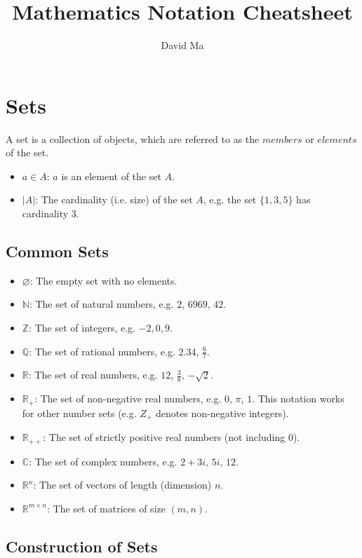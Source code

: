 \documentclass[12pt]{article}
\title{\vspace{-2.0cm}Mathematics Notation Cheatsheet}
\author{David Ma}
\theoremstyle{definition}
\newcommand{\RR}{\mathbb{R}}
\newcommand{\NN}{\mathbb{N}}
\newcommand{\CC}{\mathbb{C}}
\newcommand{\bras}[1]{\lbrace #1 \rbrace}
\begin{document}
	\maketitle
	
	\section{Sets}
	
	A set is a collection of objects, which are referred to as the $members$ or $elements$ of the set.
	
	\begin{itemize}
		\item $a \in A$: $a$ is an element of the set $A$.
		\item $|A|$: The cardinality (i.e. size) of the set $A$, e.g. the set $\bras{1, 3, 5}$ has cardinality $3$.
	\end{itemize}
	
	\subsection{Common Sets}
	\begin{itemize}
		\item $\varnothing$: The empty set with no elements.
		\item $\NN$: The set of natural numbers, e.g. $2$, $6969$, $42$.
		\item $\mathbb{Z}$: The set of integers, e.g. $-2, 0, 9$.
		\item $\mathbb{Q}$: The set of rational numbers, e.g. $2.34$, $\frac{6}{7}$.
		\item $\RR$: The set of real numbers, e.g. $12$, $\frac{3}{8}$, $-\sqrt{2}$.
		\item $\RR_+$: The set of non-negative real numbers, e.g. $0$, $\pi$, $1$. This notation works for other number sets (e.g. $Z_+$ denotes non-negative integers).
		\item $\RR_{++}$: The set of strictly positive real numbers (not including $0$).
		\item $\CC$: The set of complex numbers, e.g. $2 + 3i$, $5i$, $12$.
		\item $\RR^n$: The set of vectors of length (dimension) $n$.
		\item $\RR^{m \times n}$: The set of matrices of size $(m, n)$.
	\end{itemize}
	
	\subsection{Construction of Sets}
	
\end{document}
